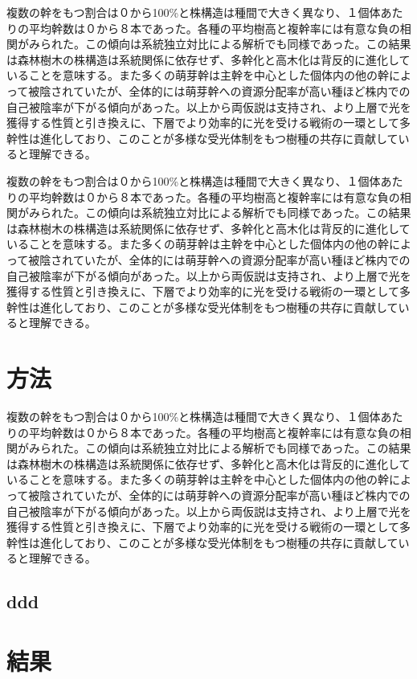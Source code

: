 \documentclass[a0, 30pt, plainboxedsections]{sciposter} %
\begin{document}
\begin{multicols}{2}
複数の幹をもつ割合は０から100\%と株構造は種間で大きく異なり、１個体あたりの平均幹数は０から８本であった。各種の平均樹高と複幹率には有意な負の相関がみられた。この傾向は系統独立対比による解析でも同様であった。この結果は森林樹木の株構造は系統関係に依存せず、多幹化と高木化は背反的に進化していることを意味する。また多くの萌芽幹は主幹を中心とした個体内の他の幹によって被陰されていたが、全体的には萌芽幹への資源分配率が高い種ほど株内での自己被陰率が下がる傾向があった。以上から両仮説は支持され、より上層で光を獲得する性質と引き換えに、下層でより効率的に光を受ける戦術の一環として多幹性は進化しており、このことが多様な受光体制をもつ樹種の共存に貢献していると理解できる。

複数の幹をもつ割合は０から100\%と株構造は種間で大きく異なり、１個体あたりの平均幹数は０から８本であった。各種の平均樹高と複幹率には有意な負の相関がみられた。この傾向は系統独立対比による解析でも同様であった。この結果は森林樹木の株構造は系統関係に依存せず、多幹化と高木化は背反的に進化していることを意味する。また多くの萌芽幹は主幹を中心とした個体内の他の幹によって被陰されていたが、全体的には萌芽幹への資源分配率が高い種ほど株内での自己被陰率が下がる傾向があった。以上から両仮説は支持され、より上層で光を獲得する性質と引き換えに、下層でより効率的に光を受ける戦術の一環として多幹性は進化しており、このことが多様な受光体制をもつ樹種の共存に貢献していると理解できる。

\section*{\huge{方法}}

複数の幹をもつ割合は０から100\%と株構造は種間で大きく異なり、１個体あたりの平均幹数は０から８本であった。各種の平均樹高と複幹率には有意な負の相関がみられた。この傾向は系統独立対比による解析でも同様であった。この結果は森林樹木の株構造は系統関係に依存せず、多幹化と高木化は背反的に進化していることを意味する。また多くの萌芽幹は主幹を中心とした個体内の他の幹によって被陰されていたが、全体的には萌芽幹への資源分配率が高い種ほど株内での自己被陰率が下がる傾向があった。以上から両仮説は支持され、より上層で光を獲得する性質と引き換えに、下層でより効率的に光を受ける戦術の一環として多幹性は進化しており、このことが多様な受光体制をもつ樹種の共存に貢献していると理解できる。

\subsection*{ddd}

\section*{\huge{結果}}


\end{multicols}
\end{document}
